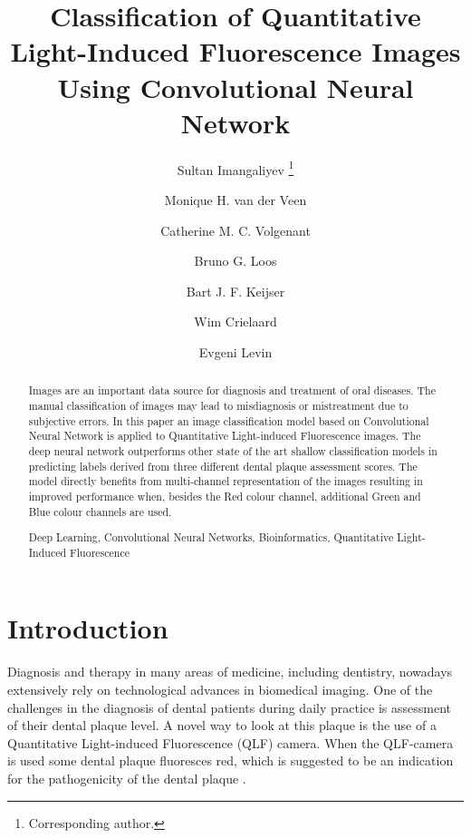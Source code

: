 \documentclass[runningheads,a4paper]{llncs}
\newcommand{\keywords}[1]{\par\addvspace\baselineskip
\noindent\keywordname\enspace\ignorespaces#1}
\begin{document}
\mainmatter  %

\title{Classification of Quantitative Light-Induced Fluorescence Images Using Convolutional Neural Network}


\author{Sultan Imangaliyev
\thanks{Corresponding author.}\and
Monique H. van der Veen \and Catherine M. C. Volgenant \and Bruno G. Loos \and Bart J. F. Keijser \and Wim Crielaard \and Evgeni Levin}


\maketitle


\begin{abstract}
Images are an important data source for diagnosis and treatment of oral diseases. The manual classification of images may lead to misdiagnosis or mistreatment due to subjective errors. In this paper an image classification model based on Convolutional Neural Network is applied to Quantitative Light-induced Fluorescence images. The deep neural network outperforms other state of the art shallow classification models in predicting labels derived from three different dental plaque assessment scores. The model directly benefits from multi-channel representation of the images resulting in improved performance when, besides the Red colour channel, additional Green and Blue colour channels are used.
\keywords{Deep Learning, Convolutional Neural Networks, Bioinformatics, Quantitative Light-Induced Fluorescence}
\end{abstract}


\section{Introduction}
Diagnosis and therapy in many areas of medicine, including dentistry, nowadays extensively rely on technological advances in biomedical imaging. One of the challenges in the diagnosis of dental patients during daily practice is assessment of their dental plaque level. A novel way to look at this plaque is the use of a Quantitative Light-induced Fluorescence (QLF) camera. When the QLF-camera is used some dental plaque fluoresces red, which is suggested to be an indication for the pathogenicity of the dental plaque \cite{van2016dynamics}.
\end{document}
